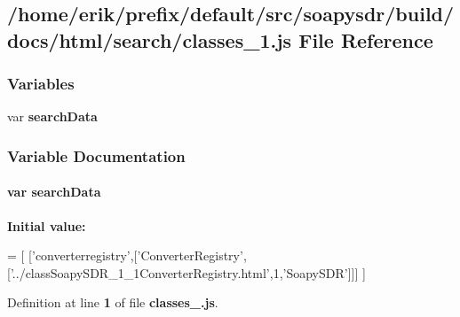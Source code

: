 \subsection{/home/erik/prefix/default/src/soapysdr/build/docs/html/search/classes\+\_\+1.js File Reference}
\label{classes__1_8js}
\subsubsection*{Variables}
\begin{DoxyCompactItemize}
\item 
var {\bf search\+Data}
\end{DoxyCompactItemize}


\subsubsection{Variable Documentation}
\paragraph[{search\+Data}]{\setlength{\rightskip}{0pt plus 5cm}var search\+Data}\label{classes__1_8js_ad01a7523f103d6242ef9b0451861231e}
{\bfseries Initial value\+:}
\begin{DoxyCode}
=
[
  [\textcolor{stringliteral}{'converterregistry'},[\textcolor{stringliteral}{'ConverterRegistry'},[\textcolor{stringliteral}{'../classSoapySDR\_1\_1ConverterRegistry.html'},1,\textcolor{stringliteral}{'SoapySDR'}]]]
]
\end{DoxyCode}


Definition at line {\bf 1} of file {\bf classes\+\_.\+js}.

